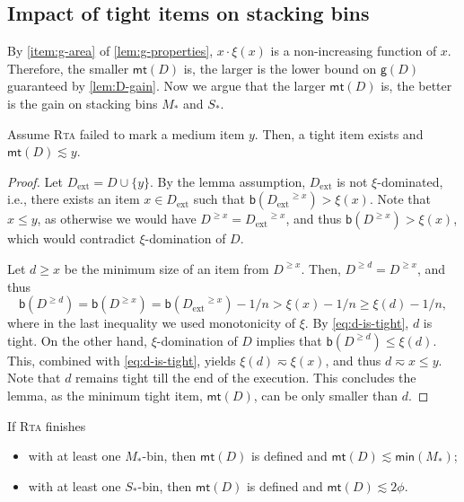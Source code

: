 \documentclass[a4paper,USenglish,cleveref]{lipics-v2019}
\newcommand{\ST}{\ensuremath{S_*}\xspace}
\newcommand{\MT}{\ensuremath{M_*}\xspace}
\newcommand{\D}{\ensuremath{D}\xspace}
\newcommand{\Dext}{\ensuremath{D_\mathrm{ext}}\xspace}
\newcommand{\smallBoundary}{\ensuremath{\phi}}
\newcommand{\g}{\ensuremath{\xi}}
\newcommand{\B}{\textsf{b}}
\newcommand{\gain}{\textsf{g}}
\newcommand{\mn}{\textsf{min}}
\newcommand{\mt}{\textsf{mt}(\D)}
\newcommand{\ALG}{\textsc{Rta}\xspace}
\begin{document}

\subsection{Impact of tight items on stacking bins}


By \cref{item:g-area} of \cref{lem:g-properties}, $x \cdot \g(x)$ is a non-increasing 
function of $x$. Therefore, the smaller $\mt$ is, the larger is the lower bound
on $\gain(\D)$ guaranteed by \cref{lem:D-gain}. Now we argue that the larger $\mt$ is,
the better is the gain on stacking bins $\MT$ and $\ST$.

\begin{lemma}
\label{lem:rej-min-relation}
Assume \ALG failed to mark a medium item $y$.
Then, a tight item exists and $\mt \lesssim y$.
\end{lemma}

\begin{proof}
Let $\Dext = \D \cup \{y\}$. By the lemma assumption, \Dext is not
$\g$-dominated, i.e., there exists an item $x \in \Dext$ such that
$\B(\Dext^{\geq x}) > \g(x)$. Note that $x \leq y$, as otherwise we would
have $\D^{\geq x} = \Dext^{\geq x}$, and thus $\B(\D^{\geq x}) >
\g(x)$, which would contradict $\g$-domination of $D$.

Let $d \geq x$ be the minimum size of an item from $\D^{\geq x}$. 
Then, $\D^{\geq d} = \D^{\geq x}$, and thus 
\begin{equation}
\label{eq:d-is-tight} 
  \B(\D^{\geq d}) = \B(\D^{\geq x})
  = \B(\Dext^{\geq x}) - 1/n > \g(x) - 1/n \geq \g(d) - 1/n, 
\end{equation}
where in the last inequality we used monotonicity of $\g$. By
\eqref{eq:d-is-tight}, $d$ is tight. On the other hand, $\g$-domination of $\D$
implies that $\B(\D^{\geq d}) \leq \g(d)$. This, combined with
\eqref{eq:d-is-tight}, yields $\g(d) \eqsim \g(x)$, and thus $d \eqsim x \leq
y$. Note that $d$ remains tight till the end of the execution. This concludes
the lemma, as the minimum tight item, $\mt$, can be only smaller than $d$. 
\end{proof}


\begin{lemma}
\label{lem:mtD-min-stacked}
If \ALG finishes 
\begin{itemize}
\item with at least one \MT-bin, then $\mt$ is defined and
$\mt \lesssim \mn(\MT)$;
\item with at least one
\ST-bin, then $\mt$ is defined and $\mt \lesssim 2 \smallBoundary$.
\end{itemize}
\end{lemma}
\end{document}
